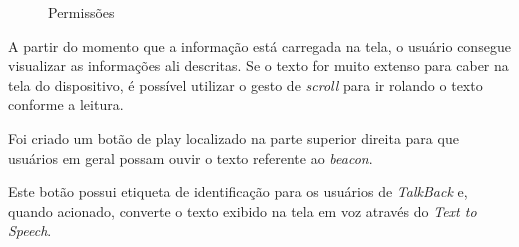 \begin{figure}[H]
  \centering
  \caption{\label{internet_bluetooth_permissoes}Permissões}
  \par{}
\end{figure}

A partir do momento que a informação está carregada na tela, o usuário consegue visualizar as informações ali descritas. Se o texto for muito extenso para caber na tela do dispositivo, é possível utilizar o gesto de \textit{scroll} para ir rolando o texto conforme a leitura.

Foi criado um botão de play localizado na parte superior direita para que usuários em geral possam ouvir o texto referente ao \textit{beacon}. 

Este botão possui etiqueta de identificação para os usuários de \textit{TalkBack} e, quando acionado, converte o texto exibido na tela em voz através do \textit{Text to Speech}.

